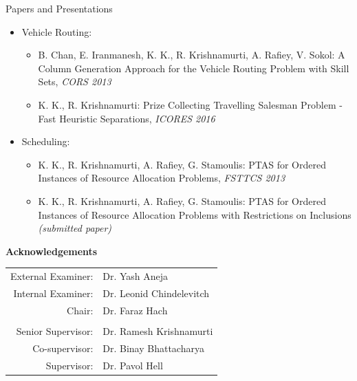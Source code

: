 \begin{frame}[t]{Papers and Presentations}
    \begin{itemize}
        \item Vehicle Routing:
            \begin{itemize}
                \item B. Chan, E. Iranmanesh, K. K., R. Krishnamurti, A. Rafiey, V. Sokol: \alert{A Column Generation Approach for the Vehicle Routing Problem with Skill Sets}, \emph{CORS 2013}
                \item K. K., R. Krishnamurti: \alert{Prize Collecting Travelling Salesman Problem - Fast Heuristic Separations}, \emph{ICORES 2016}
    \end{itemize}
    \item Scheduling:
        \begin{itemize}
            \item K. K., R. Krishnamurti, A. Rafiey, G. Stamoulis: \alert{PTAS for Ordered Instances of Resource Allocation Problems}, \emph{FSTTCS 2013}
            \item K. K., R. Krishnamurti, A. Rafiey, G. Stamoulis: \alert{PTAS for Ordered Instances of Resource Allocation Problems with Restrictions on Inclusions} \emph{(submitted paper)} 
        \end{itemize}
    \end{itemize}
\end{frame}
\begin{frame}[t,plain]
    \begin{center}
        \vspace{2cm}
        {\LARGE \textbf{Acknowledgements}}
      \begin{table}
            \begin{center}
                \resizebox{.75\textwidth}{!}
                {
                    \begin{tabular}{r l}
                        External Examiner:  &   Dr. Yash Aneja              \\
                        Internal Examiner:  &   Dr. Leonid Chindelevitch    \\
                        Chair:              &   Dr. Faraz Hach              \\
                                            &                               \\
                        Senior Supervisor:  &   Dr. Ramesh Krishnamurti     \\
                        Co-supervisor:      &   Dr. Binay Bhattacharya      \\
                        Supervisor:         &   Dr. Pavol Hell              \\
                    \end{tabular}        
                }
            \end{center}
        \end{table}
    \end{center}
\end{frame}

